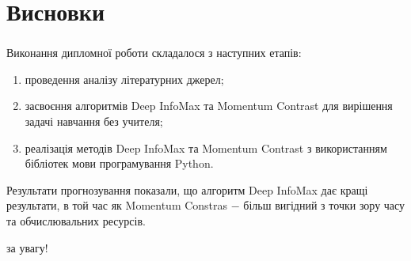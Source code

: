 \documentclass[c]{beamer}
\begin{document}
\section{Висновки}

\begin{frame}
	\frametitle{\insertsection}
	Виконання дипломної роботи складалося з наступних етапів:

	\begin{enumerate}
		\item проведення аналізу літературних джерел;\pause
		\item засвоєння алгоритмів Deep InfoMax та Momentum Contrast для вирішення задачі навчання без учителя;\pause
		\item реалізація методів Deep InfoMax та Momentum Contrast з використанням бібліотек мови програмування Python.
	\end{enumerate}

	Результати прогнозування показали, що алгоритм Deep InfoMax дає кращі результати, в той час як Momentum Constras $-$ більш вигідний з точки зору часу та обчислювальних ресурсів.
\end{frame}

\begin{frame}
	\centering{} за увагу!
\end{frame}
\end{document}
